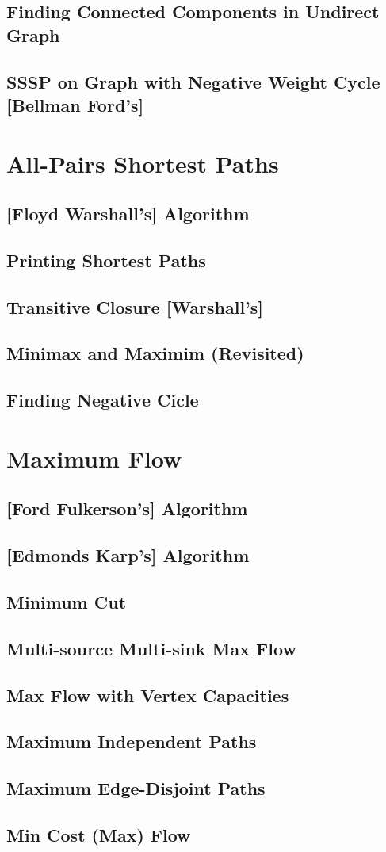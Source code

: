 	\subsection {Finding Connected Components in Undirect Graph}
		
	\subsection {SSSP on Graph with Negative Weight Cycle [Bellman Ford's]}
\section {All-Pairs Shortest Paths}
	\subsection {[Floyd Warshall's] Algorithm}
	\subsection {Printing Shortest Paths}
	\subsection {Transitive Closure [Warshall's]}
	\subsection {Minimax and Maximim (Revisited)}
	\subsection {Finding Negative Cicle}
\section {Maximum Flow}
	\subsection {[Ford Fulkerson's] Algorithm}
	\subsection {[Edmonds Karp's] Algorithm}
		
	\subsection {Minimum Cut}
	\subsection {Multi-source Multi-sink Max Flow}
	\subsection {Max Flow with Vertex Capacities}
	\subsection {Maximum Independent Paths}
	\subsection {Maximum Edge-Disjoint Paths}
	\subsection {Min Cost (Max) Flow}
